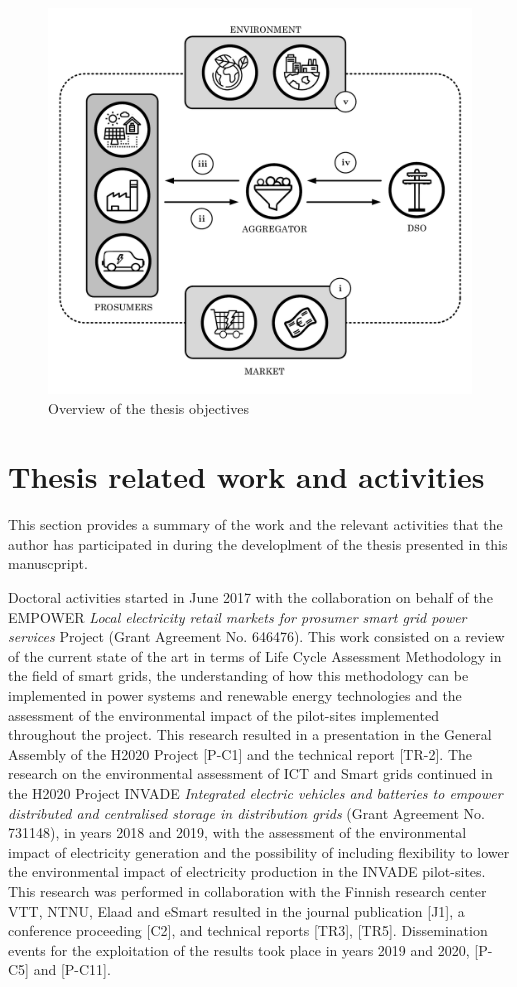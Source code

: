 \begin{figure}[]
	\centering 
	\includegraphics[width=0.9\columnwidth ]{ChapterIntro/Figures/objectives_figure_2.pdf}
		\caption{Overview of the thesis objectives}  
		\label{fig:objectives}
\end{figure}


\newpage 
\section{Thesis related work and activities}
This section provides a summary of the work and the relevant activities that the author has participated in during the developlment of the thesis presented in this manuscpript. 
 	
Doctoral activities started in June 2017 with the collaboration on behalf of the EMPOWER \textit{Local electricity retail markets for prosumer smart grid power services } Project (Grant Agreement No. 646476). This work consisted on a review of the current state of the art in terms of Life Cycle Assessment Methodology in the field of smart grids, the understanding of how this methodology can be implemented in power systems and renewable energy technologies and the assessment of the environmental impact of the pilot-sites implemented throughout the project. This research resulted in a presentation in the General Assembly of the H2020 Project [P-C1] and the technical report [TR-2]. The research on the environmental assessment of ICT and Smart grids continued in the H2020 Project INVADE \textit{Integrated electric vehicles and batteries to empower distributed and centralised storage in distribution grids} (Grant Agreement No. 731148), in years  2018 and 2019, with the assessment of the environmental impact of electricity generation and the possibility of including flexibility to lower the environmental impact of electricity production in the INVADE pilot-sites. This research was performed in collaboration with the Finnish research center VTT, NTNU, Elaad and eSmart resulted in the journal publication [J1], a conference proceeding [C2], and technical reports [TR3], [TR5]. Dissemination events for the exploitation of the results took place in years 2019 and 2020, [P-C5] and [P-C11]. 

